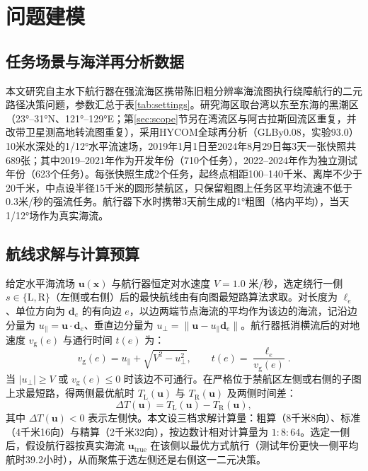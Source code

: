\section{问题建模}

\subsection{任务场景与海洋再分析数据}
本文研究自主水下航行器在强流海区携带陈旧粗分辨率海流图执行绕障航行的二元路径决策问题，参数汇总于表\ref{tab:settings}。研究海区取台湾以东至东海的黑潮区（23°--31°N、121°--129°E；第\ref{sec:scope}节另在湾流区与阿古拉斯回流区重复，并改带卫星测高地转流图重复），采用HYCOM全球再分析（GLBy0.08，实验93.0\cite{chassignet2007hycom}）10米水深处的1/12°水平流速场，2019年1月1日至2024年8月29日每3天一张快照共689张；其中2019--2021年作为开发年份（710个任务），2022--2024年作为独立测试年份（623个任务）。每张快照生成2个任务，起终点相距100--140千米、离岸不少于20千米，中点设半径15千米的圆形禁航区，只保留粗图上任务区平均流速不低于0.3米/秒的强流任务。航行器下水时携带3天前生成的1°粗图（格内平均），当天1/12°场作为真实海流。

\begin{table}[htbp]
\centering
\caption{粗分辨率海流图下自主水下航行器航路决策问题的实验设置与参数。}
\label{tab:settings}
\small

\end{table}

\subsection{航线求解与计算预算}
给定水平海流场 $\boldsymbol{u}(\boldsymbol{x})$ 与航行器恒定对水速度 $V = 1.0$ 米/秒，选定绕行一侧 $s \in \{\text{L}, \text{R}\}$（左侧或右侧）后的最快航线由有向图最短路算法求取\cite{dijkstra1959note}。对长度为 $\ell_e$、单位方向为 $\boldsymbol{d}_e$ 的有向边 $e$，以边两端节点海流的平均作为该边的海流，记沿边分量为 $u_{\parallel} = \boldsymbol{u} \cdot \boldsymbol{d}_e$、垂直边分量为 $u_{\perp} = \|\boldsymbol{u} - u_{\parallel}\boldsymbol{d}_e\|$。航行器抵消横流后的对地速度 $v_{\text{g}}(e)$ 与通行时间 $t(e)$ 为：
\begin{equation}
v_{\text{g}}(e) = u_{\parallel} + \sqrt{V^2 - u_{\perp}^2}, \qquad t(e) = \frac{\ell_e}{v_{\text{g}}(e)}.
\label{eq:edge_time}
\end{equation}
当 $|u_{\perp}| \ge V$ 或 $v_{\text{g}}(e) \le 0$ 时该边不可通行。在严格位于禁航区左侧或右侧的子图上求最短路，得两侧最优航时 $T_{\text{L}}(\boldsymbol{u})$ 与 $T_{\text{R}}(\boldsymbol{u})$ 及两侧时间差：
\begin{equation}
\Delta T(\boldsymbol{u}) = T_{\text{L}}(\boldsymbol{u}) - T_{\text{R}}(\boldsymbol{u}),
\label{eq:delta_t}
\end{equation}
其中 $\Delta T(\boldsymbol{u}) < 0$ 表示左侧快。本文设三档求解计算量：粗算（8千米8向）、标准（4千米16向）与精算（2千米32向），按边数计相对计算量为 $1:8:64$。选定一侧后，假设航行器按真实海流 $\boldsymbol{u}_{\text{true}}$ 在该侧以最优方式航行（测试年份更快一侧平均航时39.2小时），从而聚焦于选左侧还是右侧这一二元决策。

